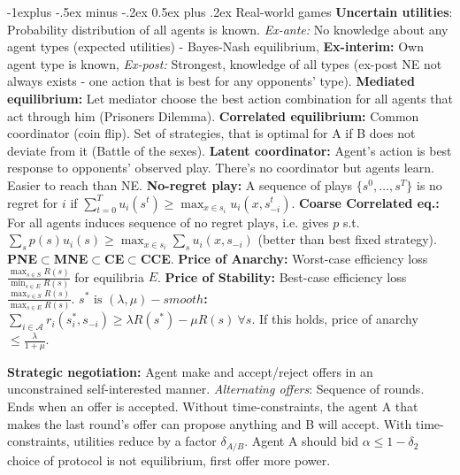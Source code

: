 \documentclass{article}
\makeatletter
\renewcommand{\subsection}{\@startsection{subsection}{2}{0mm}%
                                {-1explus -.5ex minus -.2ex}%
                                {0.5ex plus .2ex}%
                                {\color{blue}\normalfont\scriptsize\bfseries}}
\newcommand{\disadv}[1]{{\color{red} #1}}
\newcommand{\adv}[1]{{\color{green!60!blue} #1}}
\makeatother
\begin{document}
\begin{multicols*}{4}
\subsection{Real-world games}
\textbf{Uncertain utilities}: Probability distribution of all agents is known. \textit{Ex-ante:} No knowledge about any agent types (expected utilities) - Bayes-Nash equilibrium, \textbf{Ex-interim:} Own agent type is known, \textit{Ex-post:} Strongest, knowledge of all types (ex-post NE not always exists - one action that is best for any opponents' type). \textbf{Mediated equilibrium:} Let mediator choose the best action combination for all agents that act through him (Prisoners Dilemma). \textbf{Correlated equilibrium:} Common coordinator (coin flip). Set of strategies, that is optimal for A if B does not deviate from it (Battle of the sexes). \textbf{Latent coordinator:} Agent's action is best response to opponents' observed play. There's no coordinator but agents learn. \adv{Easier to reach than NE}. \textbf{No-regret play: }A sequence of plays $\{s^0,\dots,s^T\}$ is no regret for $i$ if $\sum_{t=0}^T u_i(s^t)\geq \max_{x\in s_i} u_i(x,s^t_{-i})$. \textbf{Coarse Correlated eq.: }For all agents induces sequence of no regret plays, i.e. gives $p$ s.t. $\sum_s p(s) u_i(s)\geq \max_{x\in s_i}\sum_s u_i(x,s_{-i})$ (better than best fixed strategy). \textbf{PNE$\subset$MNE$\subset$CE$\subset$CCE}. \textbf{Price of Anarchy: }Worst-case efficiency loss $\frac{\max_{s\in S} R(s)}{\min_{s\in E}R(s)}$ for equilibria $E$. \textbf{Price of Stability: }Best-case efficiency loss $\frac{\max_{s\in S} R(s)}{\max_{s\in E}R(s)}$. \textbf{$s^*\text{ is }(\lambda,\mu)-smooth$: }$\sum_{i\in \mathcal{A}}r_i(s_i^*,s_{-i})\geq \lambda R(s^*)-\mu R(s)\ \forall s$. If this holds, price of anarchy $\leq \frac{\lambda}{1+\mu}$. 

\textbf{Strategic negotiation:} Agent make and accept/reject offers in an unconstrained self-interested manner. \textit{Alternating offers}: Sequence of rounds. Ends when an offer is accepted. Without time-constraints, the agent A that makes the last round's offer can propose anything and B will accept. With time-constraints, utilities reduce by a factor $\delta_{A/B}$. Agent A should bid $\alpha \leq 1- \delta_2$ \disadv{choice of protocol is not equilibrium, first offer more power}.


\end{multicols*}
\end{document}
